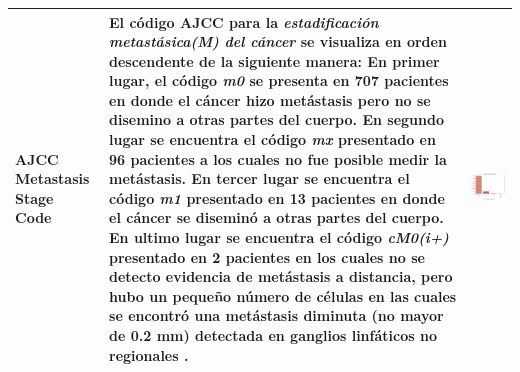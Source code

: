\begin{table}[htb!]
\begin{threeparttable}
\begin{tabular}{p{2.5cm} p{7cm} p{6.5cm}}
			\\ \hline
			AJCC Metastasis Stage Code 
			& El código AJCC para la \textit{estadificación metastásica(M) del cáncer} se visualiza en orden descendente de la siguiente manera: En primer lugar, el código \textit{m0} se presenta en 707 pacientes en donde el cáncer hizo metástasis pero no se  disemino a otras partes del cuerpo. En segundo lugar se encuentra el código \textit{mx} presentado en 96 pacientes a los cuales no fue posible medir la metástasis. En tercer lugar se encuentra el código \textit{m1} presentado en 13 pacientes en donde el cáncer se diseminó a otras partes del cuerpo. En ultimo lugar se encuentra el código \textit{cM0(i+)} presentado en 2 pacientes en los cuales no se detecto evidencia de metástasis a distancia, pero hubo un pequeño número de células en las cuales se encontró una metástasis diminuta (no mayor de 0.2 mm) detectada en ganglios linfáticos no regionales \cite{NCI}.
			& \begin{center}\includegraphics[width=1\linewidth]{NOTEBOOK/IMAGENES_DESCRIPTIVAS/2_metastasis_stage_code}\end{center}
			\\ \hline
		\end{tabular}
	\end{threeparttable}
\end{table}
\clearpage


